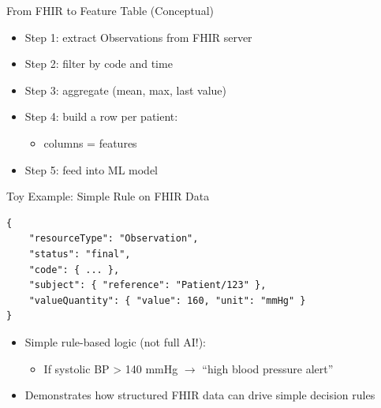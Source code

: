\documentclass[aspectratio=1610]{beamer}
\begin{document}
	\begin{frame}{From FHIR to Feature Table (Conceptual)}
		\begin{itemize}
			\item Step 1: extract Observations from FHIR server
			\item Step 2: filter by code and time
			\item Step 3: aggregate (mean, max, last value)
			\item Step 4: build a row per patient:
			\begin{itemize}
				\item columns = features
			\end{itemize}
			\item Step 5: feed into ML model
		\end{itemize}
	\end{frame}
	
	\begin{frame}[fragile]{Toy Example: Simple Rule on FHIR Data}
		\lstset{language=JSON}
		\begin{lstlisting}
{
	"resourceType": "Observation",
	"status": "final",
	"code": { ... },
	"subject": { "reference": "Patient/123" },
	"valueQuantity": { "value": 160, "unit": "mmHg" }
}
		\end{lstlisting}
		
		\begin{itemize}
			\item Simple rule-based logic (not full AI!):
			\begin{itemize}
				\item If systolic BP > 140 mmHg $\rightarrow$ ``high blood pressure alert''
			\end{itemize}
			\item Demonstrates how structured FHIR data can drive simple decision rules
		\end{itemize}
	\end{frame}
	
\end{document}
